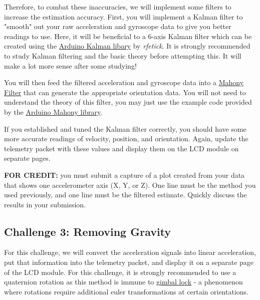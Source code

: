     Therefore, to combat these inaccuracies, we will implement some filters to increase the estimation accuracy.
    First, you will implement a Kalman filter to "smooth" out your raw acceleration and gyroscope data to give you better readings to use.
    Here, it will be beneficial to a 6-axis Kalman filter which can be created using the \href{https://github.com/rfetick/Kalman}{Arduino Kalman libary} by \textit{rfetick}. It is strongly recommended to study Kalman filtering and the basic theory before attempting this.
    It will make a lot more sense after some studying!

    You will then feed the filtered acceleration and gyroscope data into a \href{https://ahrs.readthedocs.io/en/latest/filters/mahony.html}{Mahony Filter} that can generate the appropriate orientation data.
    You will not need to understand the theory of this filter, you may just use the example code provided by the \href{https://www.arduino.cc/reference/en/libraries/mahony/}{Arduino Mahony library}.

    If you established and tuned the Kalman filter correctly, you should have some more accurate readings of velocity, position, and orientation.
    Again, update the telemetry packet with these values and display them on the LCD module on separate pages.

    \textbf{FOR CREDIT:} you must submit a capture of a plot created from your data that shows one accelerometer axis (X, Y, or Z).
    One line must be the method you used previously, and one line must be the filtered estimate.
    Quickly discuss the results in your submission.

    \subsection*{Challenge 3: Removing Gravity}
    For this challenge, we will convert the acceleration signals into linear acceleration, put that information into the telemetry packet, and display it on a separate page of the LCD module.
    For this challenge, it is strongly recommended to use a quaternion rotation as this method is immune to \href{https://www.youtube.com/watch?v=zc8b2Jo7mno}{gimbal lock} - a phenomenon where rotations require additional euler transformations at certain orientations.

